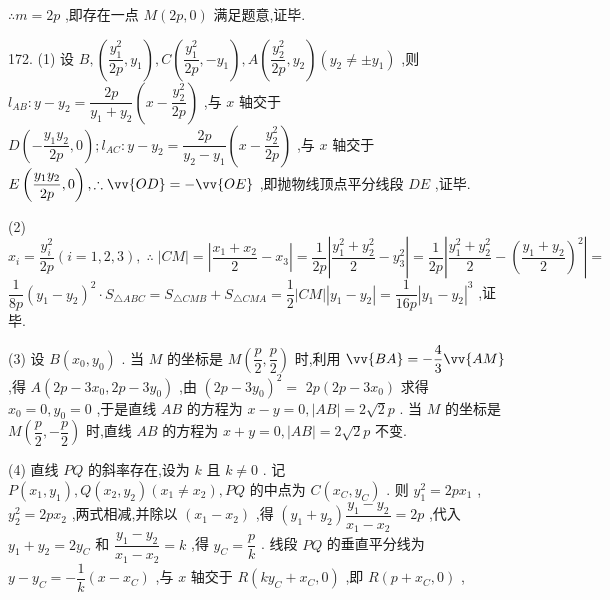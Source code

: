 $\therefore m = {2p}$ ,即存在一点 $M\left( {{2p},0}\right)$ 满足题意,证毕.

172. (1) 设 $B,\left( {\dfrac{{y}_{1}^{2}}{2p},{y}_{1}}\right) ,C\left( {\dfrac{{y}_{1}^{2}}{2p}, - {y}_{1}}\right) ,A\left( {\dfrac{{y}_{2}^{2}}{2p},{y}_{2}}\right) \left( {{y}_{2} \neq   \pm  {y}_{1}}\right)$ ,则 ${l}_{AB} : y - {y}_{2} = \dfrac{2p}{{y}_{1} + {y}_{2}}\left( {x - \dfrac{{y}_{2}^{2}}{2p}}\right)$ ,与 $x$ 轴交于 $D\left( {-\dfrac{{y}_{1}{y}_{2}}{2p},0}\right) ;{l}_{AC} : y - {y}_{2} = \dfrac{2p}{{y}_{2} - {y}_{1}}\left( {x - \dfrac{{y}_{2}^{2}}{2p}}\right)$ ,与 $x$ 轴交于 $E\left( {\dfrac{{y}_{1}{y}_{2}}{2p},0}\right) ,\therefore \vv{OD} =  - \vv{OE}$ ,即抛物线顶点平分线段 ${DE}$ ,证毕.

(2) ${x}_{i} = \dfrac{{y}_{i}^{2}}{2p}\left( {i = 1,2,3}\right) ,\;\therefore \;\left| {CM}\right|  = \left| {\dfrac{{x}_{1} + {x}_{2}}{2} - {x}_{3}}\right|  = \dfrac{1}{2p}\left| {\dfrac{{y}_{1}^{2} + {y}_{2}^{2}}{2} - {y}_{3}^{2}}\right|  = \dfrac{1}{2p}\left| {\dfrac{{y}_{1}^{2} + {y}_{2}^{2}}{2} - {\left( \dfrac{{y}_{1} + {y}_{2}}{2}\right) }^{2}}\right|  =$  $\dfrac{1}{8p}{\left( {y}_{1} - {y}_{2}\right) }^{2} \cdot  {S}_{\bigtriangleup {ABC}} = {S}_{\bigtriangleup {CMB}} + {S}_{\bigtriangleup {CMA}} = \dfrac{1}{2}\left| {CM}\right| \left| {{y}_{1} - {y}_{2}}\right|  = \dfrac{1}{16p}{\left| {y}_{1} - {y}_{2}\right| }^{3}$ ,证毕.

(3) 设 $B\left( {{x}_{0},{y}_{0}}\right)$ . 当 $M$ 的坐标是 $M\left( {\dfrac{p}{2},\dfrac{p}{2}}\right)$ 时,利用 $\vv{BA} =  - \dfrac{4}{3}\vv{AM}$ ,得 $A\left( {{2p} - 3{x}_{0},{2p} - 3{y}_{0}}\right)$ ,由 ${\left( 2p - 3{y}_{0}\right) }^{2} =$  ${2p}\left( {{2p} - 3{x}_{0}}\right)$ 求得 ${x}_{0} = 0,{y}_{0} = 0$ ,于是直线 ${AB}$ 的方程为 $x - y = 0,\left| {AB}\right|  = 2\sqrt{2}p$ . 当 $M$ 的坐标是 $M\left( {\dfrac{p}{2}, - \dfrac{p}{2}}\right)$ 时,直线 ${AB}$ 的方程为 $x + y = 0,\left| {AB}\right|  = 2\sqrt{2}p$ 不变.

(4) 直线 ${PQ}$ 的斜率存在,设为 $k$ 且 $k \neq  0$ . 记 $P\left( {{x}_{1},{y}_{1}}\right) ,Q\left( {{x}_{2},{y}_{2}}\right) \left( {{x}_{1} \neq  {x}_{2}}\right) ,{PQ}$ 的中点为 $C\left( {{x}_{C},{y}_{C}}\right)$ . 则 ${y}_{1}^{2} = {2p}{x}_{1}$ , ${y}_{2}^{2} = {2p}{x}_{2}$ ,两式相减,并除以 $\left( {{x}_{1} - {x}_{2}}\right)$ ,得 $\left( {{y}_{1} + {y}_{2}}\right) \dfrac{{y}_{1} - {y}_{2}}{{x}_{1} - {x}_{2}} = {2p}$ ,代入 ${y}_{1} + {y}_{2} = 2{y}_{C}$ 和 $\dfrac{{y}_{1} - {y}_{2}}{{x}_{1} - {x}_{2}} = k$ ,得 ${y}_{C} = \dfrac{p}{k}$ . 线段 ${PQ}$ 的垂直平分线为 $y - {y}_{C} =  - \dfrac{1}{k}\left( {x - {x}_{C}}\right)$ ,与 $x$ 轴交于 $R\left( {k{y}_{C} + {x}_{C},0}\right)$ ,即 $R\left( {p + {x}_{C},0}\right)$ ,

